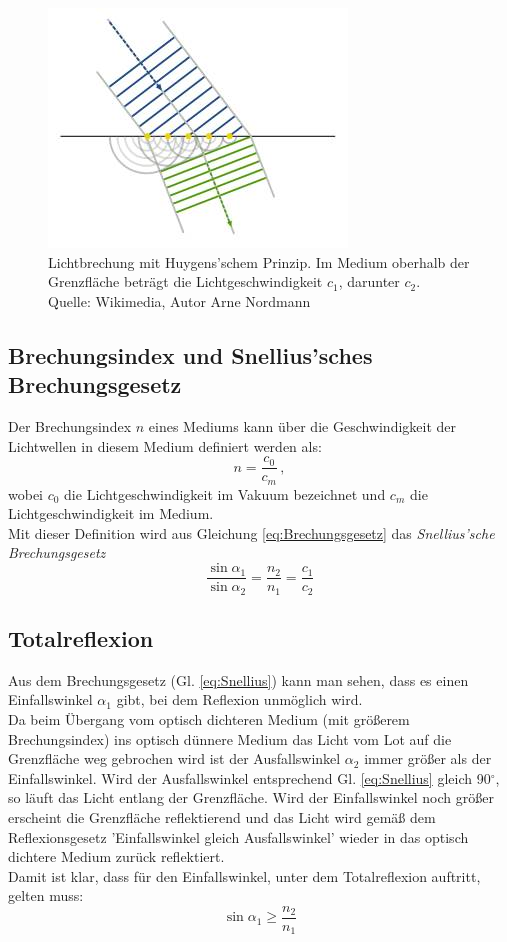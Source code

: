 \begin{figure}[hb]
	\centering
		\includegraphics[width=.5\textwidth]{Abbildungen/Brechung.jpg}
	\caption{Lichtbrechung mit Huygens'schem Prinzip. Im Medium oberhalb der Grenzfläche beträgt die Lichtgeschwindigkeit $c_1$, darunter $c_2$. \\
	Quelle: Wikimedia, Autor Arne Nordmann}
	\label{fig:brechung}
\end{figure}

\subsection{Brechungsindex und Snellius'sches Brechungsgesetz}

Der Brechungsindex $n$ eines Mediums kann über die Geschwindigkeit der Lichtwellen in diesem Medium definiert werden als:
\begin{equation}
n = \frac{c_0}{c_m}\, ,
\end{equation}
wobei $c_0$ die Lichtgeschwindigkeit im Vakuum bezeichnet und $c_m$ die Lichtgeschwindigkeit im Medium.\\

\noindent
Mit dieser Definition wird aus Gleichung \ref{eq:Brechungsgesetz} das \textit{Snellius'sche Brechungsgesetz}
\begin{equation} \label{eq:Snellius}
\frac{\sin\alpha_1}{\sin\alpha_2} = \frac{n_2}{n_1} = \frac{c_1}{c_2}
\end{equation}

\subsection{Totalreflexion}

Aus dem Brechungsgesetz (Gl. \ref{eq:Snellius}) kann man sehen, dass es einen Einfallswinkel $\alpha_1$ gibt, bei dem Reflexion unmöglich wird.\\
Da beim Übergang vom optisch dichteren Medium (mit größerem Brechungsindex) ins optisch dünnere Medium das Licht vom Lot auf die Grenzfläche weg gebrochen wird ist der Ausfallswinkel $\alpha_2$ immer größer als der Einfallswinkel. Wird der Ausfallswinkel entsprechend Gl. \ref{eq:Snellius} gleich 90$^{\circ}$, so läuft das Licht entlang der Grenzfläche. Wird der Einfallswinkel noch größer erscheint die Grenzfläche reflektierend und das Licht wird gemäß dem Reflexionsgesetz 'Einfallswinkel gleich Ausfallswinkel' wieder in das optisch dichtere Medium zurück reflektiert.\\
Damit ist klar, dass für den Einfallswinkel, unter dem Totalreflexion auftritt, gelten muss:
\begin{equation}
	\sin\alpha_1 \geq \frac{n_2}{n_1}
\end{equation}

